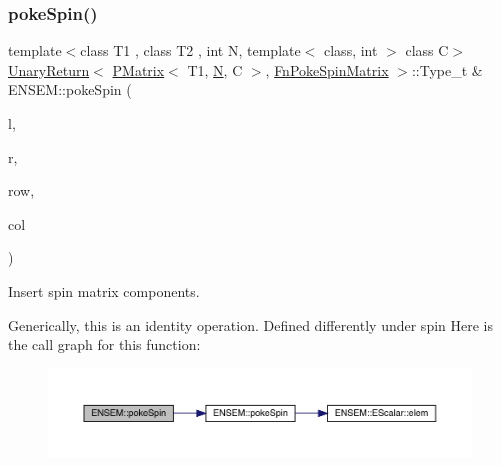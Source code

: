 \subsubsection{\texorpdfstring{pokeSpin()}{pokeSpin()}\hspace{0.1cm}{\footnotesize\ttfamily [2/2]}}
{\footnotesize\ttfamily template$<$class T1 , class T2 , int N, template$<$ class, int $>$ class C$>$ \\
\mbox{\hyperlink{structENSEM_1_1UnaryReturn}{Unary\+Return}}$<$ \mbox{\hyperlink{classENSEM_1_1PMatrix}{P\+Matrix}}$<$ T1, \mbox{\hyperlink{adat__devel_2lib_2hadron_2operator__name__util_8cc_a7722c8ecbb62d99aee7ce68b1752f337}{N}}, C $>$, \mbox{\hyperlink{structENSEM_1_1FnPokeSpinMatrix}{Fn\+Poke\+Spin\+Matrix}} $>$\+::Type\+\_\+t \& E\+N\+S\+E\+M\+::poke\+Spin (\begin{DoxyParamCaption}\item[{\mbox{\hyperlink{classENSEM_1_1PMatrix}{P\+Matrix}}$<$ T1, \mbox{\hyperlink{adat__devel_2lib_2hadron_2operator__name__util_8cc_a7722c8ecbb62d99aee7ce68b1752f337}{N}}, C $>$ \&}]{l,  }\item[{const \mbox{\hyperlink{classENSEM_1_1PMatrix}{P\+Matrix}}$<$ T2, \mbox{\hyperlink{adat__devel_2lib_2hadron_2operator__name__util_8cc_a7722c8ecbb62d99aee7ce68b1752f337}{N}}, C $>$ \&}]{r,  }\item[{int}]{row,  }\item[{int}]{col }\end{DoxyParamCaption})\hspace{0.3cm}{\ttfamily [inline]}}



Insert spin matrix components. 

Generically, this is an identity operation. Defined differently under spin Here is the call graph for this function\+:\nopagebreak
\begin{figure}[H]
\begin{center}
\leavevmode
\includegraphics[width=350pt]{df/d0a/group__primmatrix_gaf6f04aa80d2490f962a3132eb16fa98a_cgraph}
\end{center}
\end{figure}
\mbox{\label{group__primmatrix_ga95daf5fb6c2f089f11774d123f8795d5}} 
